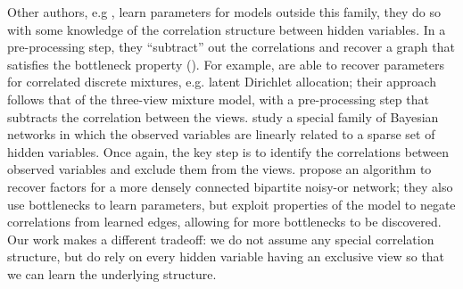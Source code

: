 
Other authors, e.g \citet{anandkumar12lda, anandkumar2013linear,
  halpern13noisyor}, learn parameters for models outside this
  family, they do so with some knowledge of the correlation structure
  between hidden variables. 
In a pre-processing step, they ``subtract'' out the correlations and
  recover a graph that satisfies the bottleneck property
  ().
%
For example,
\citet{anandkumar12lda} are able to recover parameters for correlated
  discrete mixtures, e.g. latent Dirichlet allocation; their approach
  follows that of the three-view mixture model, with a pre-processing step
  that subtracts the correlation between the views.
\citet{anandkumar2013linear} study a special family of Bayesian networks
  in which the observed variables are linearly related to a sparse set of
  hidden variables. Once again, the key step is to identify the
  correlations between observed variables and exclude them from the views.
\citet{halpern13noisyor} propose an algorithm to recover factors for
  a more densely connected bipartite noisy-or network; they also use
  bottlenecks to learn parameters, but exploit properties of the model
  to negate correlations from learned edges, allowing for more
  bottlenecks to be discovered. 
Our work makes a different tradeoff: we do not assume any special correlation structure,
but do rely on every hidden variable having an exclusive view so that we can
learn the underlying structure.


